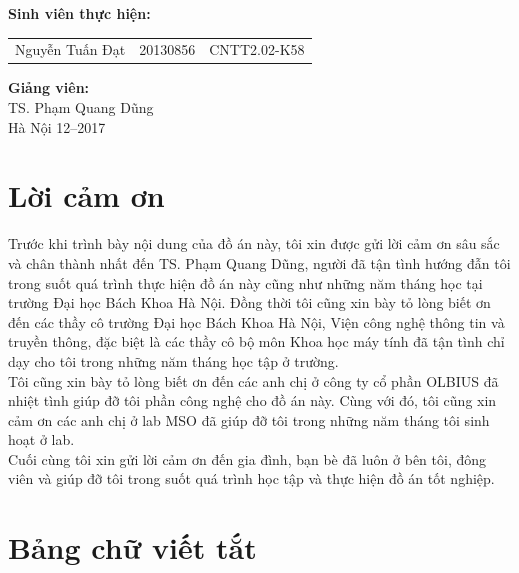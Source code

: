 \documentclass[a4paper,12pt]{report}
\renewcommand{\contentsname}{Mục lục}
\begin{document}
\begin{center}
\hspace{-5cm}\fontsize{14}{16}\selectfont \textbf{Sinh viên thực hiện:}\\[0.1cm] 
\begin{longtable}{l c c}
Nguyễn Tuấn Đạt & 20130856 & CNTT2.02-K58 
\end{longtable}
\vspace{0.3cm}
\hspace{-8.5cm}\fontsize{14}{16}\selectfont \textbf{Giảng viên:}\\[0.1cm]
\hspace{-2.7cm}\fontsize{14}{16}\selectfont TS. Phạm Quang Dũng \\[3cm]
\fontsize{16}{19}\selectfont Hà Nội 12--2017
\end{center}
\chapter*{Lời cảm ơn}
Trước khi trình bày nội dung của đồ án này, tôi xin được gửi lời cảm ơn sâu sắc và chân thành nhất đến TS. Phạm Quang Dũng, người đã tận tình hướng đẫn tôi trong suốt quá trình thực hiện đồ án này cũng như những năm tháng học tại trường Đại học Bách Khoa Hà Nội. Đồng thời tôi cũng xin bày tỏ lòng biết ơn đến các thầy cô trường Đại học Bách Khoa Hà Nội, Viện công nghệ thông tin và truyền thông, đặc biệt là các thầy cô bộ môn Khoa học máy tính đã tận tình chỉ dạy cho tôi trong những năm tháng học tập ở trường. \\ 

Tôi cũng xin bày tỏ lòng biết ơn đến các anh chị ở công ty cổ phần OLBIUS đã nhiệt tình giúp đỡ tôi phần công nghệ cho đồ án này. Cùng với đó, tôi cũng xin cảm ơn các anh chị ở lab MSO đã giúp đỡ tôi trong những năm tháng tôi sinh hoạt ở lab.\\

Cuối cùng tôi xin gửi lời cảm ơn đến gia đình, bạn bè đã luôn ở bên tôi, đông viên và giúp đỡ tôi trong suốt quá trình học tập và thực hiện đồ án tốt nghiệp. 
\newpage
\pdfbookmark{\contentsname}{toc}

\tableofcontents
\newpage
\chapter*{Bảng chữ viết tắt}
\printacronyms[include-classes=abbrev,heading=none]

\listoffigures
\end{document}
